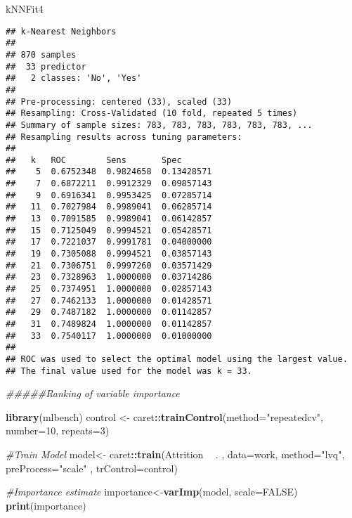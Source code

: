 \documentclass[]{article}
\newenvironment{Shaded}{\begin{snugshade}}{\end{snugshade}}
\newcommand{\CommentTok}[1]{\textcolor[rgb]{0.56,0.35,0.01}{\textit{#1}}}
\newcommand{\DataTypeTok}[1]{\textcolor[rgb]{0.13,0.29,0.53}{#1}}
\newcommand{\DecValTok}[1]{\textcolor[rgb]{0.00,0.00,0.81}{#1}}
\newcommand{\KeywordTok}[1]{\textcolor[rgb]{0.13,0.29,0.53}{\textbf{#1}}}
\newcommand{\NormalTok}[1]{#1}
\newcommand{\OperatorTok}[1]{\textcolor[rgb]{0.81,0.36,0.00}{\textbf{#1}}}
\newcommand{\OtherTok}[1]{\textcolor[rgb]{0.56,0.35,0.01}{#1}}
\newcommand{\StringTok}[1]{\textcolor[rgb]{0.31,0.60,0.02}{#1}}
\begin{document}
\begin{Shaded}
\begin{Highlighting}[]
\NormalTok{kNNFit4}
\end{Highlighting}
\end{Shaded}

\begin{verbatim}
## k-Nearest Neighbors 
## 
## 870 samples
##  33 predictor
##   2 classes: 'No', 'Yes' 
## 
## Pre-processing: centered (33), scaled (33) 
## Resampling: Cross-Validated (10 fold, repeated 5 times) 
## Summary of sample sizes: 783, 783, 783, 783, 783, 783, ... 
## Resampling results across tuning parameters:
## 
##   k   ROC        Sens       Spec      
##    5  0.6752348  0.9824658  0.13428571
##    7  0.6872211  0.9912329  0.09857143
##    9  0.6916341  0.9953425  0.07285714
##   11  0.7027984  0.9989041  0.06285714
##   13  0.7091585  0.9989041  0.06142857
##   15  0.7125049  0.9994521  0.05428571
##   17  0.7221037  0.9991781  0.04000000
##   19  0.7305088  0.9994521  0.03857143
##   21  0.7306751  0.9997260  0.03571429
##   23  0.7328963  1.0000000  0.03714286
##   25  0.7374951  1.0000000  0.02857143
##   27  0.7462133  1.0000000  0.01428571
##   29  0.7487182  1.0000000  0.01142857
##   31  0.7489824  1.0000000  0.01142857
##   33  0.7540117  1.0000000  0.01000000
## 
## ROC was used to select the optimal model using the largest value.
## The final value used for the model was k = 33.
\end{verbatim}

\begin{Shaded}
\begin{Highlighting}[]
\CommentTok{#####Ranking of variable importance}

\KeywordTok{library}\NormalTok{(mlbench)}
\NormalTok{control <-}\StringTok{ }\NormalTok{caret}\OperatorTok{::}\KeywordTok{trainControl}\NormalTok{(}\DataTypeTok{method=}\StringTok{"repeatedcv"}\NormalTok{, }\DataTypeTok{number=}\DecValTok{10}\NormalTok{, }\DataTypeTok{repeats=}\DecValTok{3}\NormalTok{)}

\CommentTok{#Train Model}
\NormalTok{model<-}\StringTok{ }\NormalTok{caret}\OperatorTok{::}\KeywordTok{train}\NormalTok{(Attrition }\OperatorTok{~}\StringTok{ }\NormalTok{. , }\DataTypeTok{data=}\NormalTok{work, }\DataTypeTok{method=}\StringTok{"lvq"}\NormalTok{, }\DataTypeTok{preProcess=}\StringTok{"scale"}\NormalTok{ , }\DataTypeTok{trControl=}\NormalTok{control)}


\CommentTok{#Importance estimate}
\NormalTok{importance<-}\KeywordTok{varImp}\NormalTok{(model, }\DataTypeTok{scale=}\OtherTok{FALSE}\NormalTok{)}
\KeywordTok{print}\NormalTok{(importance)}
\end{Highlighting}
\end{Shaded}
\end{document}
